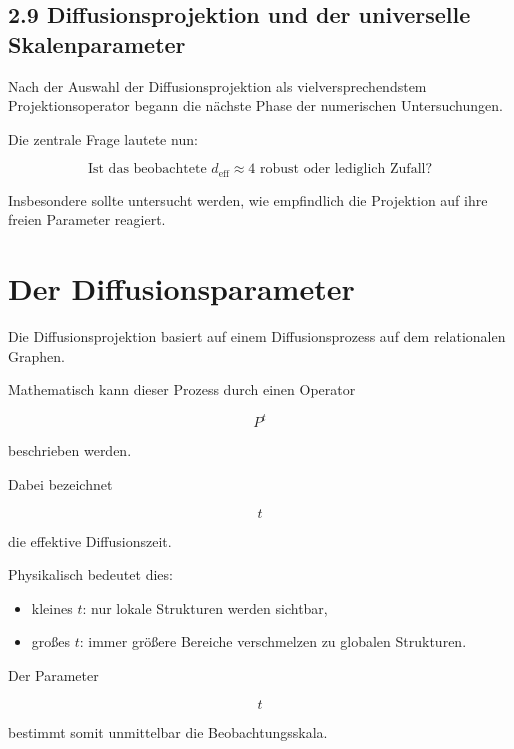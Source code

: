 \subsection{2.9 Diffusionsprojektion und der universelle Skalenparameter}

Nach der Auswahl der Diffusionsprojektion als vielversprechendstem Projektionsoperator begann die nächste Phase der numerischen Untersuchungen.

Die zentrale Frage lautete nun:

\[
\boxed{
\text{Ist das beobachtete } d_{\mathrm{eff}}\approx4
\text{ robust oder lediglich Zufall?}
}
\]

Insbesondere sollte untersucht werden, wie empfindlich die Projektion auf ihre freien Parameter reagiert.


\section*{Der Diffusionsparameter}

Die Diffusionsprojektion basiert auf einem Diffusionsprozess auf dem relationalen Graphen.

Mathematisch kann dieser Prozess durch einen Operator

\[
P^t
\]

beschrieben werden.

Dabei bezeichnet

\[
t
\]

die effektive Diffusionszeit.

Physikalisch bedeutet dies:

\begin{itemize}

\item

kleines \(t\):
nur lokale Strukturen werden sichtbar,

\item

großes \(t\):
immer größere Bereiche verschmelzen zu globalen Strukturen.

\end{itemize}

Der Parameter

\[
t
\]

bestimmt somit unmittelbar die Beobachtungsskala.


